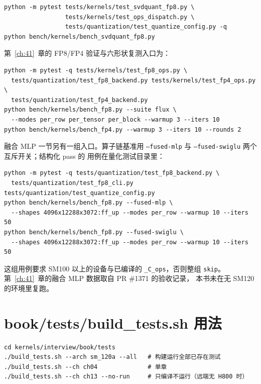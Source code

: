 \begin{lstlisting}[style=console]
python -m pytest tests/kernels/test_svdquant_fp8.py \
                 tests/kernels/test_ops_dispatch.py \
                 tests/quantization/test_quantize_config.py -q
python bench/kernels/bench_svdquant_fp8.py
\end{lstlisting}

\noindent 第~\ref{ch:41}~章的 FP8/FP4 验证与六形状复测入口为：

\begin{lstlisting}[style=console]
python -m pytest -q tests/kernels/test_fp8_ops.py \
  tests/quantization/test_fp8_backend.py tests/kernels/test_fp4_ops.py \
  tests/quantization/test_fp4_backend.py
python bench/kernels/bench_fp8.py --suite flux \
  --modes per_row per_tensor per_block --warmup 3 --iters 10
python bench/kernels/bench_fp4.py --warmup 3 --iters 10 --rounds 2
\end{lstlisting}

\noindent 融合 MLP 一节另有一组入口。算子链基准用
\texttt{--fused-mlp} 与 \texttt{--fused-swiglu} 两个互斥开关；结构化 pass 的
用例在量化测试目录里：

\begin{lstlisting}[style=console]
python -m pytest -q tests/quantization/test_fp8_backend.py \
  tests/quantization/test_fp8_cli.py tests/quantization/test_quantize_config.py
python bench/kernels/bench_fp8.py --fused-mlp \
  --shapes 4096x12288x3072:ff_up --modes per_row --warmup 10 --iters 50
python bench/kernels/bench_fp8.py --fused-swiglu \
  --shapes 4096x12288x3072:ff_up --modes per_row --warmup 10 --iters 50
\end{lstlisting}

这组用例要求 SM100 以上的设备与已编译的 \texttt{\_C\_ops}，否则整组
\texttt{skip}。第~\ref{ch:41}~章的融合 MLP 数据取自 PR \#1371 的验收记录，
本书未在无 SM120 的环境里复跑。

\section{book/tests/build\_tests.sh 用法}

\begin{lstlisting}[style=console]
cd kernels/interview/book/tests
./build_tests.sh --arch sm_120a --all   # 构建运行全部已存在测试
./build_tests.sh --ch ch04              # 单章
./build_tests.sh --ch ch13 --no-run     # 只编译不运行（远端无 H800 时）
\end{lstlisting}

